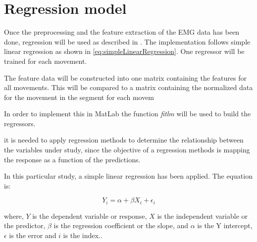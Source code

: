 \section{Regression model}


Once the preprocessing and the feature extraction of the EMG data has been done, regression will be used as described in . The implementation follows simple linear regression as shown in \eqref{eq:simpleLinearRegression}. One regressor will be trained for each movement. 


The feature data will be constructed into one matrix containing the features for all movements. This will be compared to a matrix containing the normalized data for the movement in the segment for each movem








 In order to implement this in MatLab the function \textit{fitlm} will be used to build the regressors. 


it is needed to apply regression methods to determine the relationship between the variables under study, since the objective of a regression methods is mapping the response as a function of the predictions. \cite{hahne2014}

In this particular study, a simple linear regression has been applied. The equation is:

\begin{equation} %
Y_i = \alpha + \beta X_i + \epsilon_i
\end{equation}

where, $Y$ is the dependent variable or response, $X$ is the independent variable or the predictor, $\beta$ is the regression coefficient or the slope, and $\alpha$ is the Y intercept,  $\epsilon$ is the error and $i$ is the index.\cite{zar2009}.

